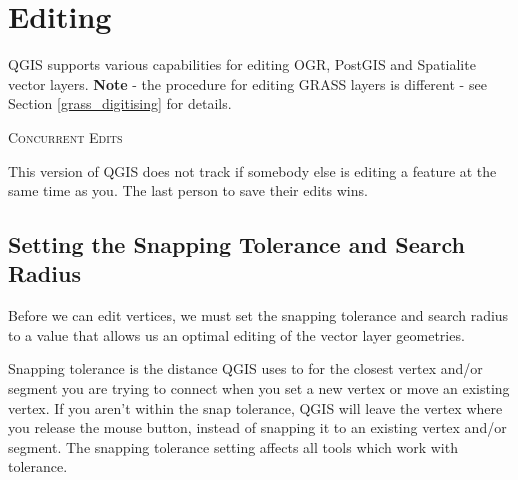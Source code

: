 \section{Editing}

QGIS supports various capabilities for editing OGR, PostGIS and Spatialite 
vector layers. \textbf{Note} - the procedure for editing GRASS layers is 
different - see Section \ref{grass_digitising} for details.

\begin{Tip}\caption{\textsc{Concurrent Edits}}
This version of QGIS does not track if somebody else is editing a
feature at the same time as you. The last person to save their edits wins.
\end{Tip}

\subsection{Setting the Snapping Tolerance and Search Radius}\label{snapping_tolerance}

Before we can edit vertices, we must set the snapping
tolerance and search radius to a value that allows us an optimal editing of
the vector layer geometries. 


Snapping tolerance is the distance QGIS uses to  for the
closest vertex and/or segment you are trying to
connect when you set a new vertex or move an existing vertex. If you aren't
within the snap tolerance, QGIS will leave the vertex where you release the
mouse button, instead of snapping it to an existing vertex and/or segment. 
The snapping tolerance setting affects all tools which work with tolerance. 

